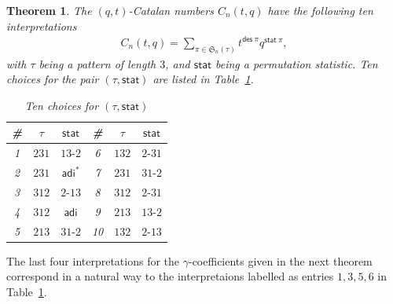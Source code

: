 \documentclass[12pt,reqno]{amsart}
\numberwithin{equation}{section}
\theoremstyle{plain}
\newtheorem{theorem}{Theorem}[section]
\newtheorem{lemma}[theorem]{Lemma}
\theoremstyle{definition}
\def\S{\mathfrak{S}}
\def\exc{\mathsf{exc}}
\def\ai{\mathsf{adi}}
\def\des{\mathsf{des}}
\def\inv{\mathsf{inv}}
\def\cab{31\text{-}2}
\def\bca{2\text{-}31}
\def\acb{13\text{-}2}
\def\bac{2\text{-}13}
\def\stat{\mathsf{stat}}
\begin{document}
\begin{theorem}\label{qnara}
The $(q,t)$-Catalan numbers $C_n(t, q)$ have the following ten interpretations
\begin{align*}
C_n(t, q)=\sum_{\pi\in\S_n(\tau)}t^{\des\:\pi}q^{\stat\:\pi},
\end{align*}
with $\tau$ being a pattern of length $3$, and $\stat$ being a permutation statistic. Ten choices for the pair $(\tau,\stat)$ are listed in Table~\ref{ten}.
\begin{table}[tbp]\caption{Ten choices for $(\tau,\stat)$}\label{ten}
\centering
\begin{tabular}{|c|c|c||c|c|c|}
\hline
\# & $\tau$ & $\stat$ & \# & $\tau$ & $\stat$\\
\hline
1 & $231$ & $\acb$ & 6 & $132$ & $\bca$\\
2 & $231$ & $\ai^*$ & 7 & $231$ & $\cab$\\
3 & $312$ & $\bac$ & 8 & $312$ & $\bca$\\
4 & $312$ & $\ai$ & 9 & $213$ & $\acb$\\
5 & $213$ & $\cab$ & 10 & $132$ & $\bac$\\
\hline
\end{tabular}
\end{table}
\end{theorem}

The last four interpretations for the $\gamma$-coefficients given in the next theorem correspond in a natural way to the interpretaions labelled as entries $1,3,5,6$ in Table~\ref{ten}.
%
%
\end{document}
